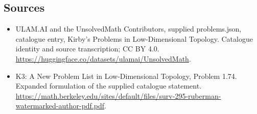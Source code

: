 \documentclass[11pt,a4paper]{article}
\begin{document}
\subsection{Sources}
\begin{itemize}
\item[S1] ULAM.AI and the UnsolvedMath Contributors, supplied problems.json, catalogue entry, Kirby's Problems in Low-Dimensional Topology. Catalogue identity and source transcription; CC BY 4.0.
\url{https://huggingface.co/datasets/ulamai/UnsolvedMath}.
\item[S2] K3: A New Problem List in Low-Dimensional Topology, Problem 1.74. Expanded formulation of the supplied catalogue statement.
\url{https://math.berkeley.edu/sites/default/files/surv-295-ruberman-watermarked-author-pdf.pdf}.
\end{itemize}
\end{document}
